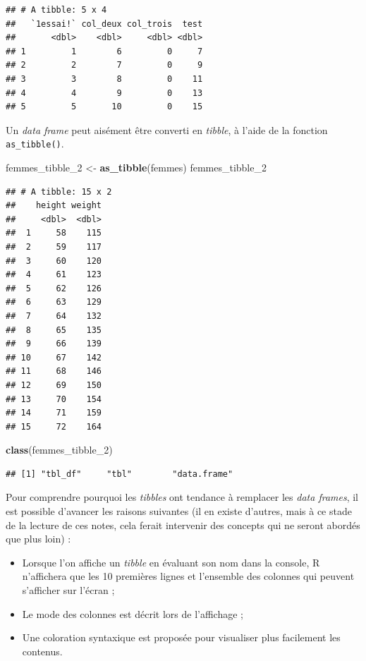 \documentclass[
  11pt,
]{book}
\newenvironment{Shaded}{\begin{snugshade}}{\end{snugshade}}
\newcommand{\DecValTok}[1]{\textcolor[rgb]{0.00,0.00,0.81}{#1}}
\newcommand{\KeywordTok}[1]{\textcolor[rgb]{0.13,0.29,0.53}{\textbf{#1}}}
\newcommand{\NormalTok}[1]{#1}
\newcommand{\StringTok}[1]{\textcolor[rgb]{0.31,0.60,0.02}{#1}}
\providecommand{\tightlist}{%
  \setlength{\itemsep}{0pt}\setlength{\parskip}{0pt}}
\numberwithin{equation}{section}
\numberwithin{countremarque}{section}
\begin{document}
\begin{lstlisting}
## # A tibble: 5 x 4
##   `1essai!` col_deux col_trois  test
##       <dbl>    <dbl>     <dbl> <dbl>
## 1         1        6         0     7
## 2         2        7         0     9
## 3         3        8         0    11
## 4         4        9         0    13
## 5         5       10         0    15
\end{lstlisting}

Un \emph{data frame} peut aisément être converti en \emph{tibble}, à l'aide de la fonction \texttt{as\_tibble()}.

\begin{Shaded}
\begin{Highlighting}[]
\NormalTok{femmes\_tibble\_}\DecValTok{2}\NormalTok{ \textless{}{-}}\StringTok{ }\KeywordTok{as\_tibble}\NormalTok{(femmes)}
\NormalTok{femmes\_tibble\_}\DecValTok{2}
\end{Highlighting}
\end{Shaded}

\begin{lstlisting}
## # A tibble: 15 x 2
##    height weight
##     <dbl>  <dbl>
##  1     58    115
##  2     59    117
##  3     60    120
##  4     61    123
##  5     62    126
##  6     63    129
##  7     64    132
##  8     65    135
##  9     66    139
## 10     67    142
## 11     68    146
## 12     69    150
## 13     70    154
## 14     71    159
## 15     72    164
\end{lstlisting}

\begin{Shaded}
\begin{Highlighting}[]
\KeywordTok{class}\NormalTok{(femmes\_tibble\_}\DecValTok{2}\NormalTok{)}
\end{Highlighting}
\end{Shaded}

\begin{lstlisting}
## [1] "tbl_df"     "tbl"        "data.frame"
\end{lstlisting}

Pour comprendre pourquoi les \emph{tibbles} ont tendance à remplacer les \emph{data frames}, il est possible d'avancer les raisons suivantes (il en existe d'autres, mais à ce stade de la lecture de ces notes, cela ferait intervenir des concepts qui ne seront abordés que plus loin) :

\begin{itemize}
\tightlist
\item
  Lorsque l'on affiche un \emph{tibble} en évaluant son nom dans la console, R n'affichera que les 10 premières lignes et l'ensemble des colonnes qui peuvent s'afficher sur l'écran ;
\item
  Le mode des colonnes est décrit lors de l'affichage ;
\item
  Une coloration syntaxique est proposée pour visualiser plus facilement les contenus.
\end{itemize}
\end{document}
